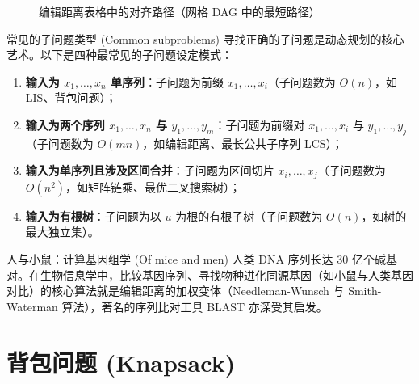 \begin{figure}[htbp]
\centering
{}
\caption{编辑距离表格中的对齐路径（网格 DAG 中的最短路径）}
\label{fig:edit_grid}
\end{figure}

\begin{sidebarbox}{常见的子问题类型 (Common subproblems)}
寻找正确的子问题是动态规划的核心艺术。以下是四种最常见的子问题设定模式：
\begin{enumerate}
    \item \textbf{输入为 $x_1, \dots, x_n$ 单序列}：子问题为前缀 $x_1, \dots, x_i$（子问题数为 $O(n)$，如 LIS、背包问题）；
    \item \textbf{输入为两个序列 $x_1, \dots, x_n$ 与 $y_1, \dots, y_m$}：子问题为前缀对 $x_1, \dots, x_i$ 与 $y_1, \dots, y_j$（子问题数为 $O(mn)$，如编辑距离、最长公共子序列 LCS）；
    \item \textbf{输入为单序列且涉及区间合并}：子问题为区间切片 $x_i, \dots, x_j$（子问题数为 $O(n^2)$，如矩阵链乘、最优二叉搜索树）；
    \item \textbf{输入为有根树}：子问题为以 $u$ 为根的有根子树（子问题数为 $O(n)$，如树的最大独立集）。
\end{enumerate}
\end{sidebarbox}

\begin{sidebarbox}{人与小鼠：计算基因组学 (Of mice and men)}
人类 DNA 序列长达 30 亿个碱基对。在生物信息学中，比较基因序列、寻找物种进化同源基因（如小鼠与人类基因对比）的核心算法就是编辑距离的加权变体（Needleman-Wunsch 与 Smith-Waterman 算法），著名的序列比对工具 BLAST 亦深受其启发。
\end{sidebarbox}

\section{背包问题 (Knapsack)}

